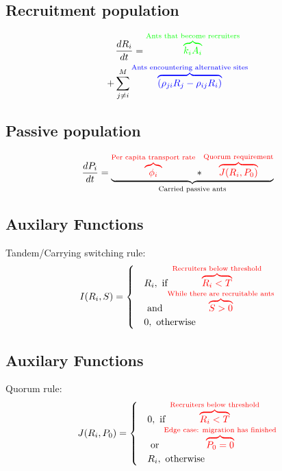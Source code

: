 \documentclass[letterpaper]{article}
\makeatletter
\def\mcolor#1#{\@mcolor{#1}}
\def\@mcolor#1#2#3{%
  \protect\leavevmode
  \begingroup
    \color#1{#2}#3%
  \endgroup
}
\newcommand{\annotate}[3]{
\mcolor{#1}{\overbrace{#3}^\text{#2}}
}
\makeatother
\begin{document}
  \subsection{Recruitment population}
      \Large
      \begin{multline}
          \frac{dR_i}{dt} = \annotate{green}{Ants that become recruiters}{k_iA_i} \\
          + \sum_{j \neq i}^M \annotate{blue}{Ants encountering alternative sites}{(\rho_{ji}R_j - \rho_{ij}R_i)}
      \end{multline}
  \subsection{Passive population}
      \Large
      \begin{equation}
          \frac{dP_i}{dt} = \underbrace{\annotate{red}{Per capita transport rate}{\phi_i} * \annotate{red}{Quorum requirement}{J(R_i, P_0)}}_\text{Carried passive ants}
      \end{equation}
  \subsection{Auxilary Functions}
      \Large
      Tandem/Carrying switching rule:
      \begin{equation}
          I(R_i, S) = 
          \begin{cases}
              & R_i,  \text{ if } \annotate{red}{Recruiters below threshold}{R_i < T} \\
              &       \text{     and } \annotate{red}{While there are recruitable ants}{S > 0}\\
              & 0, \text{ otherwise}
          \end{cases}
      \end{equation}

  \subsection{Auxilary Functions}
      \Large
      Quorum rule:
      \begin{equation}
          J(R_i, P_0) = 
          \begin{cases}
              & 0,  \text{ if } \annotate{red}{Recruiters below threshold}{R_i < T} \\  
              &     \text{     or } \annotate{red}{Edge case: migration has finished}{P_0 = 0}\\
              & R_i, \text{ otherwise}
          \end{cases}
      \end{equation}
\end{document}
